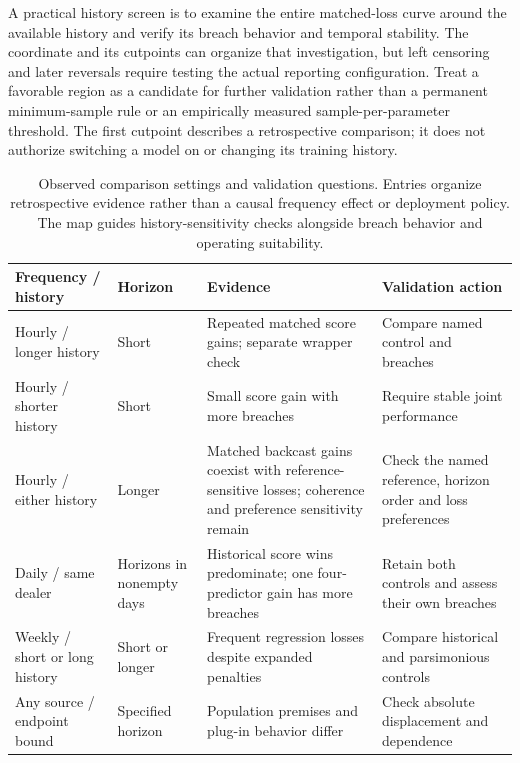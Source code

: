 \documentclass[11pt,a4paper]{article}
\begin{document}
A practical history screen is to examine the entire matched-loss curve around the available history and verify its breach behavior and temporal stability. The coordinate and its cutpoints can organize that investigation, but left censoring and later reversals require testing the actual reporting configuration. Treat a favorable region as a candidate for further validation rather than a permanent minimum-sample rule or an empirically measured sample-per-parameter threshold. The first cutpoint describes a retrospective comparison; it does not authorize switching a model on or changing its training history.

\begin{table}[htbp]\centering\small
\caption{Observed comparison settings and validation questions. Entries organize retrospective evidence rather than a causal frequency effect or deployment policy. The map guides history-sensitivity checks alongside breach behavior and operating suitability.}\label{tab:map}
\begin{tabular}{>{\raggedright\arraybackslash}p{3.3cm}>{\raggedright\arraybackslash}p{3.7cm}>{\raggedright\arraybackslash}p{4.0cm}>{\raggedright\arraybackslash}p{3.2cm}}\toprule
Frequency / history & Horizon & Evidence & Validation action\\\midrule
Hourly / longer history & Short & Repeated matched score gains; separate wrapper check & Compare named control and breaches\\
Hourly / shorter history & Short & Small score gain with more breaches & Require stable joint performance\\
Hourly / either history & Longer & Matched backcast gains coexist with reference-sensitive losses; coherence and preference sensitivity remain & Check the named reference, horizon order and loss preferences\\
Daily / same dealer & Horizons in nonempty days & Historical score wins predominate; one four-predictor gain has more breaches & Retain both controls and assess their own breaches\\
Weekly / short or long history & Short or longer & Frequent regression losses despite expanded penalties & Compare historical and parsimonious controls\\
Any source / endpoint bound & Specified horizon & Population premises and plug-in behavior differ & Check absolute displacement and dependence\\
\bottomrule\end{tabular}

\end{table}
\end{document}

